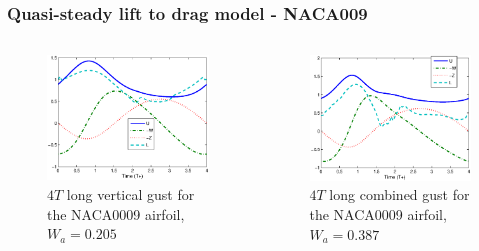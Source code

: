 \documentclass[compress]{beamer}
\begin{document}
\begin{frame}
  \frametitle{Quasi-steady lift to drag model - NACA009}
  \begin{columns}
    \begin{figure}
      \begin{center}
	\includegraphics[width=1\textwidth]{./Figures/Windtype=1_Tg=4_Wg=0p205_UAV_alphamax=12.eps}
      \end{center}
      \caption{$4T$ long vertical gust for the NACA0009 airfoil, $W_a=0.205$}
    \end{figure}
    \begin{figure}[h]
      \begin{center}
	\includegraphics[width=1\textwidth]{./Figures/Windtype=3_Tg=4_Wg=0p387_UAV_alphamax=12.eps}
      \end{center}
      \caption{$4T$ long combined gust for the NACA0009 airfoil, $W_a=0.387$}
    \end{figure}
  \end{columns} %
\end{frame}
\end{document}
